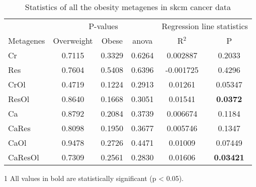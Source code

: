 \begin{appendices}
\begin{table}[htpb]
	\centering
	\caption{Statistics of all the obesity metagenes in \gls{skcm} cancer data}
	\label{tab:degmetaskcm}
	\begin{threeparttable}
		\begin{tabular}{lccccc}
			& \multicolumn{3}{c}{ P-values} & \multicolumn{2}{c}{ Regression line statistics}\\
			\cmidrule(r){2-4} \cmidrule(r){5-6}
			Metagenes &  Overweight &  Obese &  \gls{anova} &  R$^2$ &  P \\
			\hline
			\hline
			\rule{0pt}{2.25ex}Cr      & 0.7115                      & 0.3329  & 0.6264             & 0.002887   & 0.2033              \\
            Res     & 0.7604                      & 0.5408  & 0.6396             & -0.001725  & 0.4296              \\
            CrOl    & 0.4719                      & 0.1224  & 0.2913             & 0.01261    & 0.05347             \\
            ResOl   & 0.8640                      & 0.1668  & 0.3051             & 0.01541    & {\bfseries 0.0372}\tnote{1}  \\
            Ca      & 0.8792                      & 0.2084  & 0.3739             & 0.006674   & 0.1184              \\
            CaRes   & 0.8098                      & 0.1950  & 0.3677             & 0.005746   & 0.1347              \\
            CaOl    & 0.9478                      & 0.2726  & 0.4471             & 0.01009    & 0.07449             \\
            CaResOl & 0.7309                      & 0.2561  & 0.2830             & 0.01606    & {\bfseries 0.03421} \\
			\hline
			\hline
		\end{tabular}
		\begin{tablenotes}
			\item [1] All values in bold are statistically significant (p \textless{} 0.05).
		\end{tablenotes}
	\end{threeparttable}
\end{table}


\end{appendices}

